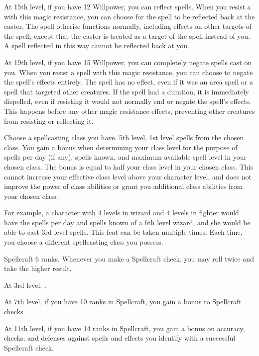     At 15th level, if you have 12 Willpower, you can reflect spells.
    When you resist a  with this magic resistance, you can choose for the spell to be reflected back at the caster.
    The spell otherise functions normally, including effects on other targets of the spell, except that the caster is treated as a target of the spell instead of you.
    A spell reflected in this way cannot be reflected back at you.

    At 19th level, if you have 15 Willpower, you can completely negate spells cast on you.
    When you resist a spell with this magic resistance, you can choose to negate the spell's effects entirely.
    The spell has no effect, even if it was an area spell or a spell that targeted other creatures.
    If the spell had a duration, it is immediately dispelled, even if resisting it would not normally end or negate the spell's effects.
    This happens before any other magic resistance effects, preventing other creatures from resisting or reflecting it.

    Choose a spellcasting class you have.
    \featpres 5th level, 1st level spells from the chosen class.
    \featben You gain a bonus when determining your class level for the purpose of spells per day (if any), spells known, and maximum available spell level in your chosen class.
    The bonus is equal to half your class level in your chosen class.
    This cannot increase your effective class level above your character level, and does not improve the power of class abilities or grant you additional class abilities from your chosen class.

    For example, a character with 4 levels in wizard and 4 levels in fighter would have the spells per day and spells known of a 6th level wizard, and she would be able to cast 3rd level spells.
     This feat can be taken multiple times.
    Each time, you choose a different spellcasting class you possess.

    \featpre Spellcraft 6 ranks.
    \featben Whenever you make a Spellcraft check, you may roll twice and take the higher result.

    At 3rd level, \tdash.

    At 7th level, if you have 10 ranks in Spellcraft, you gain a  bonus to Spellcraft checks.

    At 11th level, if you have 14 ranks in Spellcraft, you gain a  bonus on accuracy, checks, and defenses against spells and  effects you identify with a successful Spellcraft check.

